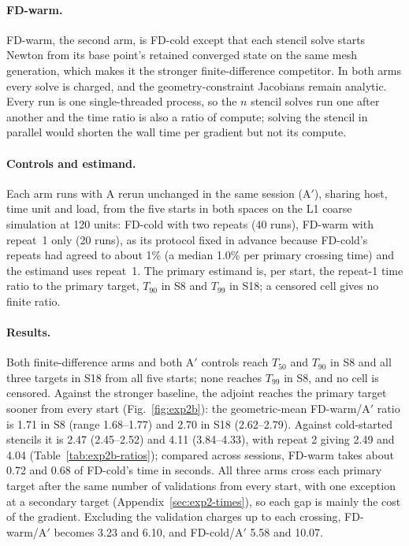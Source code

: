 \paragraph{FD-warm.}
FD-warm, the second arm, is FD-cold except that each stencil solve starts
Newton from its base point's retained converged state on the same mesh
generation, which makes it the stronger finite-difference competitor. In
both arms every solve is charged, and the geometry-constraint Jacobians
remain analytic. Every run is one single-threaded process, so the $n$
stencil solves run one after another and the time ratio is also a ratio
of compute; solving the stencil in parallel would shorten the wall time
per gradient but not its compute.

\paragraph{Controls and estimand.}
Each arm runs with A rerun unchanged in the
same session (A$'$), sharing host, time unit and load, from the five starts
in both spaces on the L1 coarse simulation at 120 units: FD-cold with two
repeats (40 runs), FD-warm with repeat~1 only (20 runs), as its protocol
fixed in advance because FD-cold's repeats had agreed to about 1\% (a
median 1.0\% per primary crossing time) and the estimand uses repeat~1. The
primary estimand is, per start, the repeat-1 time ratio to the primary
target, $T_{90}$ in S8 and $T_{99}$ in S18; a censored cell gives no
finite ratio.

\paragraph{Results.}
Both finite-difference arms and both A$'$ controls reach $T_{50}$ and $T_{90}$
in S8 and all three targets in S18 from all five starts; none
reaches $T_{99}$ in S8, and no cell is censored. Against the stronger
baseline, the adjoint reaches the primary target sooner from every start
(Fig.~\ref{fig:exp2b}): the geometric-mean FD-warm/A$'$ ratio is 1.71 in
S8 (range 1.68--1.77) and 2.70 in S18 (2.62--2.79). Against
cold-started stencils it is 2.47 (2.45--2.52) and 4.11 (3.84--4.33), with
repeat 2 giving 2.49 and 4.04 (Table~\ref{tab:exp2b-ratios}); compared
across sessions, FD-warm takes about 0.72 and 0.68 of FD-cold's time in seconds.
All three arms cross each primary target after the same number of
validations from every start, with one exception at a secondary target
(Appendix~\ref{sec:exp2-times}), so each gap is mainly the cost of the
gradient. Excluding the validation charges up to each crossing, FD-warm/A$'$
becomes 3.23 and 6.10, and FD-cold/A$'$ 5.58 and 10.07.

